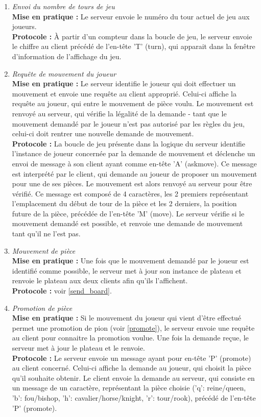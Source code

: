 \documentclass[10pt, a4paper]{article}
\begin{document}
\begin{enumerate}
\item \textit{Envoi du nombre de tours de jeu} \\
\textbf{Mise en pratique :} Le serveur envoie le numéro du tour actuel de jeu aux joueurs.  \\
\textbf{Protocole :} À partir d'un compteur dans la boucle de jeu, le serveur envoie le chiffre au client précédé de l'en-tête 'T' (turn), qui apparait dans la fenêtre d'information de l'affichage du jeu.
\label{send_turn}

\item \textit{Requête de mouvement du joueur} \\
\textbf{Mise en pratique :} Le serveur identifie le joueur qui doit effectuer un mouvement et envoie une requête au client approprié. Celui-ci affiche la requête au joueur, qui entre le mouvement de pièce voulu. Le mouvement est renvoyé au serveur, qui vérifie la légalité de la demande - tant que le mouvement demandé par le joueur n'est pas autorisé par les règles du jeu, celui-ci doit rentrer une nouvelle demande de mouvement.\\
\textbf{Protocole :} La boucle de jeu présente dans la logique du serveur identifie l'instance de joueur concernée par la demande de mouvement et déclenche un envoi de message à son client ayant comme en-tête 'A' (askmove). Ce message est interprété par le client, qui demande au joueur de proposer un mouvement pour une de ses pièces. Le mouvement est alors renvoyé au serveur pour être vérifié. Ce message est composé de 4 caractères, les 2 premiers représentant l'emplacement du début de tour de la pièce et les 2 derniers, la position future de la pièce, précédée de l'en-tête 'M' (move). Le serveur vérifie si le mouvement demandé est possible, et renvoie une demande de mouvement tant qu'il ne l'est pas.

\item \textit{Mouvement de pièce} \\
\textbf{Mise en pratique :} Une fois que le mouvement demandé par le joueur est identifié comme possible, le serveur met à jour son instance de plateau et renvoie le plateau aux deux clients afin qu'ils l'affichent.  \\
\textbf{Protocole :} voir \ref{send_board}.

\item \textit{Promotion de pièce}\\
\textbf{Mise en pratique :} Si le mouvement du joueur qui vient d'être effectué permet une promotion de pion (voir \ref{promote}), le serveur envoie une requête au client pour connaitre la promotion voulue. Une fois la demande reçue, le serveur met à jour le plateau et le renvoie.\\
\textbf{Protocole :} Le serveur envoie un message ayant pour en-tête 'P' (promote) au client concerné. Celui-ci affiche la demande au joueur, qui choisit la pièce qu'il souhaite obtenir. Le client envoie la demande au serveur, qui consiste en un message de un caractère, représentant la pièce choisie ('q':  reine/queen, 'b': fou/bishop, 'h': cavalier/horse/knight, 'r': tour/rook), précédé de l'en-tête 'P' (promote).


\end{enumerate}
\end{document}
